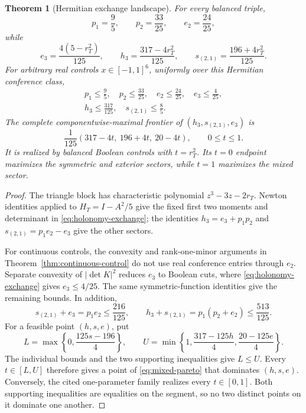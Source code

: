 \documentclass[11pt]{article}
\newtheorem{theorem}{Theorem}[section]
\theoremstyle{remark}
\begin{document}
\begin{theorem}[Hermitian exchange landscape]
\label{thm:hermitian-landscape}
For every balanced triple,
\[
 p_1=\frac95,\qquad p_2=\frac{33}{25},\qquad e_2=\frac{24}{25},
\]
while
\begin{equation}
\label{eq:holonomy-exchange}
 e_3=\frac{4(5-r_T^2)}{125},\qquad
 h_3=\frac{317-4r_T^2}{125},\qquad
 s_{(2,1)}=\frac{196+4r_T^2}{125}.
\end{equation}
For arbitrary real controls \(x\in[-1,1]^6\), uniformly over this Hermitian
conference class,
\[
\begin{gathered}
 p_1\le\frac95,\quad p_2\le\frac{33}{25},\quad
 e_2\le\frac{24}{25},\quad e_3\le\frac4{25},\\
 h_3\le\frac{317}{125},\quad s_{(2,1)}\le\frac85.
\end{gathered}
\]
The complete componentwise-maximal frontier of
\((h_3,s_{(2,1)},e_3)\) is
\begin{equation}
\label{eq:mixed-pareto}
 \frac1{125}(317-4t,\ 196+4t,\ 20-4t),
 \qquad 0\le t\le1.
\end{equation}
It is realized by balanced Boolean controls with \(t=r_T^2\).  Its
\(t=0\) endpoint maximizes the symmetric and exterior sectors, while
\(t=1\) maximizes the mixed sector.
\end{theorem}

\begin{proof}
The triangle block has characteristic polynomial
\(z^3-3z-2r_T\).  Newton identities applied to
\(H_T=I-A^2/5\) give the fixed first two moments and determinant in
\eqref{eq:holonomy-exchange}; the identities
\(h_3=e_3+p_1p_2\) and \(s_{(2,1)}=p_1e_2-e_3\) give the other sectors.

For continuous controls, the convexity and rank-one-minor arguments in
Theorem~\ref{thm:continuous-control} do not use real conference entries through
\(e_2\).  Separate convexity of \(|\det K|^2\) reduces \(e_3\) to Boolean
cuts, where \eqref{eq:holonomy-exchange} gives \(e_3\le4/25\).  The same
symmetric-function identities give the remaining bounds.  In addition,
\[
 s_{(2,1)}+e_3=p_1e_2\le\frac{216}{125},\qquad
 h_3+s_{(2,1)}=p_1(p_2+e_2)\le\frac{513}{125}.
\]
For a feasible point \((h,s,e)\), put
\[
 L=\max\left\{0,\frac{125s-196}{4}\right\},\qquad
 U=\min\left\{1,\frac{317-125h}{4},\frac{20-125e}{4}\right\}.
\]
The individual bounds and the two supporting inequalities give \(L\le U\).
Every \(t\in[L,U]\) therefore gives a point of
\eqref{eq:mixed-pareto} that dominates \((h,s,e)\).  Conversely, the cited
one-parameter family realizes every \(t\in[0,1]\).  Both supporting
inequalities are equalities on the segment, so no two distinct points on it
dominate one another.
\end{proof}
\end{document}
